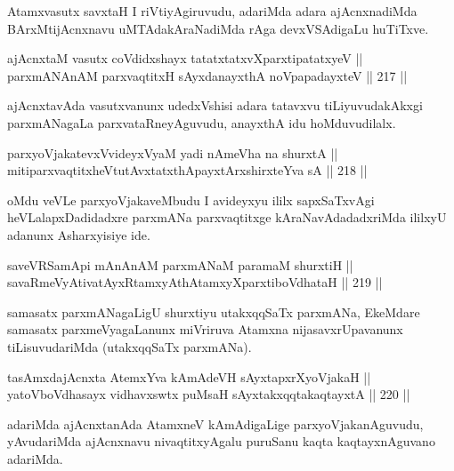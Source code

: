 \begin{artha}
Atamxvasutx savxtaH I riVtiyAgiruvudu, adariMda adara ajAcnxnadiMda
BArxMtijAcnxnavu uMTAdakAraNadiMda rAga devxVSAdigaLu huTiTxve.
\end{artha}

\begin{shl}
ajAcnxtaM vasutx coVdidxshayx tatatxtatxvXparxtipatatxyeV || \\
parxmANAnAM parxvaqtitxH sAyxdanayxthA noVpapadayxteV ||  217 ||  
\end{shl}

\begin{artha}
ajAcnxtavAda vasutxvanunx udedxVshisi adara tatavxvu tiLiyuvudakAkxgi
parxmANagaLa parxvataRneyAguvudu, anayxthA idu hoMduvudilalx.
\end{artha}

\begin{shl}
parxyoVjakatevxV\s videyxVyaM yadi nAmeVha na shurxtA || \\
mitiparxvaqtitxheVtutAvxtatxthA\s payxtArx\s \s shirxteYva sA ||  218 ||  
\end{shl}

\begin{artha}
oMdu veVLe parxyoVjakaveMbudu I avideyxyu ililx sapxSaTxvAgi
heVLalapxDadidadxre parxmANa parxvaqtitxge kAraNavAdadadxriMda ililxyU
adanunx Asharxyisiye ide.
\end{artha}

\begin{shl}
saveVRSamApi mAnAnAM parxmANaM paramaM shurxtiH || \\
savaRmeVyAtivatAyxRtamxyAthAtamxyXparxtiboVdhataH ||  219 ||  
\end{shl}

\begin{artha}
samasatx parxmANagaLigU shurxtiyu utakxqqSaTx parxmANa, EkeMdare
samasatx parxmeVyagaLanunx miVriruva Atamxna nijasavxrUpavanunx
tiLisuvudariMda (utakxqqSaTx parxmANa).
\end{artha}

\begin{shl}
tasAmxdajAcnxta AtemxYva kAmAdeVH sAyxtapxrXyoVjakaH || \\
yatoV\s boVdhasayx vidhavxswtx puMsaH sAyxtakxqqtakaqtayxtA ||  220 ||  
\end{shl}

\begin{artha}
adariMda ajAcnxtanAda AtamxneV kAmAdigaLige parxyoVjakanAguvudu,
yAvudariMda ajAcnxnavu nivaqtitxyAgalu puruSanu kaqta kaqtayxnAguvano
adariMda.
\end{artha}

